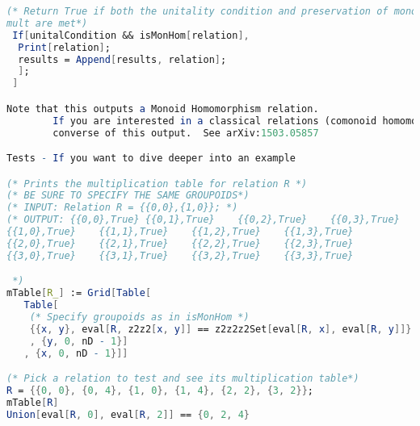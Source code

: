 \begin{lstlisting}[language=Mathematica]
 (* Return True if both the unitality condition and preservation of monoid
mult are met*)
 If[unitalCondition && isMonHom[relation],
  Print[relation];
  results = Append[results, relation];
  ];
 ]

Note that this outputs a Monoid Homomorphism relation.
        If you are interested in a classical relations (comonoid homomorphism relations), you will need to take the relational 
        converse of this output.  See arXiv:1503.05857

Tests - If you want to dive deeper into an example

(* Prints the multiplication table for relation R *)
(* BE SURE TO SPECIFY THE SAME GROUPOIDS*)
(* INPUT: Relation R = {{0,0},{1,0}}; *)
(* OUTPUT: {{0,0},True} {{0,1},True}    {{0,2},True}    {{0,3},True}
{{1,0},True}    {{1,1},True}    {{1,2},True}    {{1,3},True}
{{2,0},True}    {{2,1},True}    {{2,2},True}    {{2,3},True}
{{3,0},True}    {{3,1},True}    {{3,2},True}    {{3,3},True}

 *)
mTable[R_] := Grid[Table[
   Table[
    (* Specify groupoids as in isMonHom *)
    {{x, y}, eval[R, z2z2[x, y]] == z2z2z2Set[eval[R, x], eval[R, y]]}
    , {y, 0, nD - 1}]
   , {x, 0, nD - 1}]]

(* Pick a relation to test and see its multiplication table*)
R = {{0, 0}, {0, 4}, {1, 0}, {1, 4}, {2, 2}, {3, 2}};
mTable[R]
Union[eval[R, 0], eval[R, 2]] == {0, 2, 4}
\end{lstlisting}

